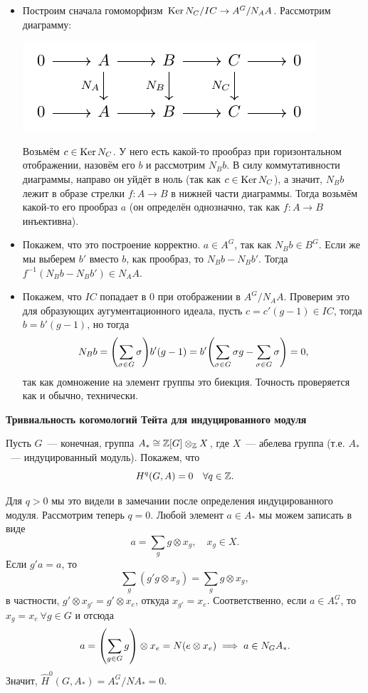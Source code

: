  	 \begin{itemize}
 	 	\item Построим сначала гомоморфизм $\operatorname{Ker}{N_C}/IC \to A^G/N_A A$. Рассмотрим диаграмму: 
 	 	\begin{center}
 	 		\includegraphics{lectures/6/pictures/cd_7.pdf}
 	 	\end{center}

 	 	Возьмём $c \in \operatorname{Ker}{N_C}$. У него есть какой-то прообраз при горизонтальном отображении, назовём его $b$ и рассмотрим $N_{B}b$. В силу коммутативности диаграммы, направо он уйдёт в ноль (так как $c \in \operatorname{Ker}{N_C}$), а значит, $N_{B}b$ лежит в образе стрелки  $f\colon A \to B$ в нижней части диаграммы. Тогда возьмём какой-то его прообраз $a$ (он определён однозначно, так как $f\colon A \to B$ инъективна). 

 	 	\item Покажем, что это построение корректно. $a \in A^{G}$, так как $N_B b \in B^G$. Если же мы выберем $b'$ вместо $b$, как прообраз, то $N_Bb - N_B b'$. Тогда $f^{-1}(N_Bb - N_B b') \in N_A A$. 

 	 	\item Покажем, что $IC$ попадает в 0 при отображении в $A^G/N_A A$. Проверим это для образующих аугументационного идеала, пусть $c = c' (g - 1) \in IC$, тогда $b = b' (g - 1)$, но тогда 
 	 	\[
 	 	 	N_B b = \lr*{\sum_{\sigma \in G} \sigma} b' (g - 1) = b'\lr*{ \sum_{\sigma \in G} \sigma g - \sum_{\sigma \in G} \sigma } = 0,
 	 	 \] 
 	 	 так как домножение на элемент группы это биекция. Точность проверяется как и обычно, технически. 
 	 \end{itemize}

    \noindent\bf{Тривиальность когомологий Тейта для индуцированного модуля} 

 	 Пусть $G$~--- конечная, группа $A_* \cong \mathbb{Z}[G] \otimes_{\mathbb{Z}} X$, где $X$~--- абелева группа (т.е. $A_*$~--- индуцированный модуль). Покажем, что 
 	 \[
 	 	H^{q}(G, A) = 0 \quad \forall q \in \mathbb{Z}.
 	 \]

 	 Для $q > 0$ мы это видели в замечании после определения индуцированного модуля. Рассмотрим теперь $q = 0$. Любой элемент $a \in A_*$ мы можем записать в виде 
 	 \[
 	 		a = \sum_{g} g \otimes x_{g}, \quad x_g \in X.
 	 \]
 	 Если $g'a = a$, то 
 	 \[
 	 	\sum_{g} (g' g \otimes x_g) = \sum_{g} g \otimes x_{g},
 	 \]
 	 в частности, $g' \otimes x_{g'} = g' \otimes x_{e}$, откуда $x_{g'} = x_{e}$. Соответственно, если $a \in A_*^G$, то $x_{g} = x_{e} \ \forall g \in G$ и отсюда 
 	 \[
 	 	a = \lr*{\sum_{g \in G} g} \otimes x_{e} = N\lr*{ e \otimes x_{e} } \implies a \in N_{G}A_*.
 	 \]
 	 Значит, $\widehat{H}^0(G, A_*) = A_*^G/NA_* = 0$. 

